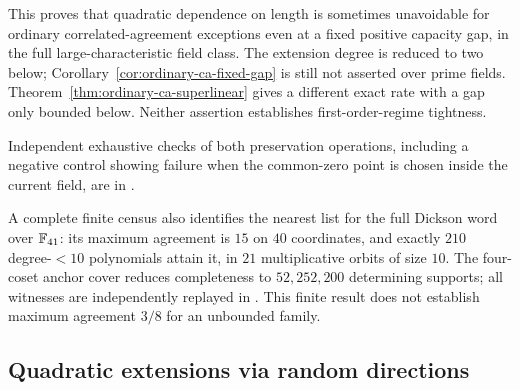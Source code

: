 This proves that quadratic dependence on length is sometimes unavoidable
for ordinary correlated-agreement exceptions even at a fixed positive
capacity gap, in the full large-characteristic field class. The extension
degree is reduced to two below; Corollary~\ref{cor:ordinary-ca-fixed-gap}
is still not asserted over prime fields. Theorem~\ref{thm:ordinary-ca-superlinear}
gives a different exact rate with a gap only bounded below. Neither assertion establishes first-order-regime tightness.

Independent exhaustive checks of both preservation operations, including
a negative control showing failure when the common-zero point is chosen
inside the current field, are in
.

A complete finite census also identifies the nearest list for the full
Dickson word over $\mathbb F_{41}$: its maximum agreement is $15$ on $40$
coordinates, and exactly $210$ degree-$<10$ polynomials attain it,
in $21$ multiplicative orbits of size $10$. The four-coset anchor
cover reduces completeness to $52{,}252{,}200$ determining supports;
all witnesses are independently replayed in
. This finite result does
not establish maximum agreement $3/8$ for an unbounded family.

\subsection{Quadratic extensions via random directions}

